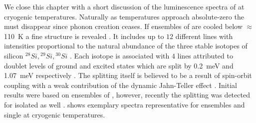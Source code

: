 



    We close this chapter with a short discussion of the luminescence spectra of \sivs at cryogenic temperatures. Naturally as temperatures approach absolute-zero the \psb must disappear since phonon creation ceases. If ensembles of \sivs are cooled below $\approx$ \SI{110}{\kelvin} a fine structure is revealed \cite{neu2013low}. It includes up to $12$ different lines with intensities proportional to the natural abundance of the three stable isotopes of silicon ${}^{28}Si, {}^{29}Si, {}^{30}Si$ \cite{Clark1995}. Each isotope is associated with $4$ lines attributed to doublet levels of ground and excited states which are split by \SI{0.2}{\milli\eV} and \SI{1.07}{\milli\eV} respectively \cite{Rogers2014, Hepp2014, Clark1995}. The splitting itself is believed to be a result of spin-orbit coupling with a weak contribution of the dynamic Jahn-Teller effect \cite{Hepp2014}. Initial results were based on ensembles of \sivs, however, recently the splitting was detected for isolated \sivs as well \cite{Dietrich2014}.  shows exemplary spectra representative for ensembles and single \siv at cryogenic temperatures.

